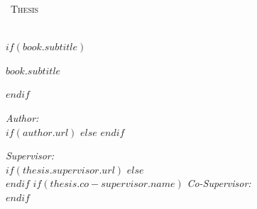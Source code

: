 \frontmatter %

\pagestyle{plain} %


\begin{titlepage}
\begin{center}

\vspace*{.06\textheight}
{\scshape\LARGE \univname\par}\vspace{1.5cm} %
\textsc{\Large \degreename\ Thesis}\\[0.5cm] %

\HRule \\[0.4cm] %
{\huge \bfseries \ttitle\par}\vspace{0.2cm} %
$if(book.subtitle)$
{\large\bfseries $book.subtitle$\par}\vspace{0.2cm} %
$endif$
\HRule \\[1.5cm] %
 
\begin{minipage}[t]{0.4\textwidth}
\begin{flushleft} \large
\emph{Author:}\\
$if(author.url)$
\href{$author.url$}{\authorname} %
$else$
\authorname
$endif$
\end{flushleft}
\end{minipage}
\begin{minipage}[t]{0.4\textwidth}
\begin{flushright} \large
\emph{Supervisor:} \\
$if(thesis.supervisor.url)$%
\href{$thesis.supervisor.url$}{\supname} %
$else$%
\supname\\[0.3cm]
$endif$
$if(thesis.co-supervisor.name)$
\emph{Co-Supervisor:}\\
\cosupname
$endif$
\end{flushright}
\end{minipage}\\[3cm]
 

\end{center}
\end{titlepage}

